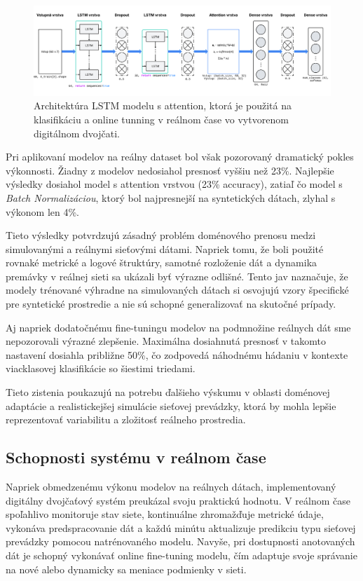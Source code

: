 \documentclass[a4paper,conference]{IEEEtran}
\begin{document}
\begin{figure}
    \centering
    \includegraphics[width=1\linewidth]{model_architecture.png}
    \caption{Architektúra LSTM modelu s attention, ktorá je použitá na klasifikáciu a online tunning v reálnom čase vo vytvorenom digitálnom dvojčati.}
    \label{fig:model_attention}
\end{figure}

Pri aplikovaní modelov na reálny dataset bol však pozorovaný dramatický pokles výkonnosti. Žiadny z modelov nedosiahol presnosť vyššiu než 23\%. Najlepšie výsledky dosiahol model s attention vrstvou (23\% accuracy), zatiaľ čo model s \textit{Batch Normalizáciou}, ktorý bol najpresnejší na syntetických dátach, zlyhal s výkonom len 4\%.

Tieto výsledky potvrdzujú zásadný problém doménového prenosu medzi simulovanými a reálnymi sieťovými dátami. Napriek tomu, že boli použité rovnaké metrické a logové štruktúry, samotné rozloženie dát a dynamika premávky v reálnej sieti sa ukázali byť výrazne odlišné. Tento jav naznačuje, že modely trénované výhradne na simulovaných dátach si osvojujú vzory špecifické pre syntetické prostredie a nie sú schopné generalizovať na skutočné prípady.

Aj napriek dodatočnému fine-tuningu modelov na podmnožine reálnych dát sme nepozorovali výrazné zlepšenie. Maximálna dosiahnutá presnosť v takomto nastavení dosiahla približne 50\%, čo zodpovedá náhodnému hádaniu v kontexte viacklasovej klasifikácie so šiestimi triedami.

Tieto zistenia poukazujú na potrebu ďalšieho výskumu v oblasti doménovej adaptácie a realistickejšej simulácie sieťovej prevádzky, ktorá by mohla lepšie reprezentovať variabilitu a zložitosť reálneho prostredia.

\subsection*{Schopnosti systému v reálnom čase}
\label{subsec_even}
Napriek obmedzenému výkonu modelov na reálnych dátach, implementovaný digitálny dvojčaťový systém preukázal svoju praktickú hodnotu. V reálnom čase spoľahlivo monitoruje stav siete, kontinuálne zhromažďuje metrické údaje, vykonáva predspracovanie dát a každú minútu aktualizuje predikciu typu sieťovej prevádzky pomocou natrénovaného modelu. Navyše, pri dostupnosti anotovaných dát je schopný vykonávať online fine-tuning modelu, čím adaptuje svoje správanie na nové alebo dynamicky sa meniace podmienky v sieti.
\end{document}
